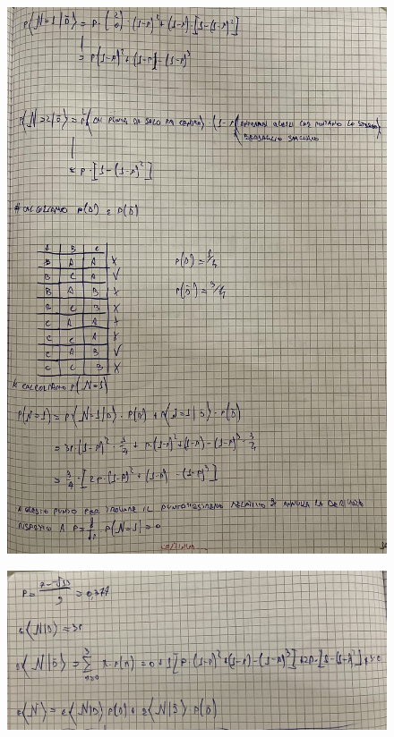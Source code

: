 \documentclass{article}
\begin{document}
\begin{figure}[ht]
\centering
\includegraphics[scale=0.10]{ese/39a.jpeg}
\end{figure}
\begin{figure}[ht]
\centering
\includegraphics[scale=0.10]{ese/39b.jpeg}
\end{figure}
\end{document}
